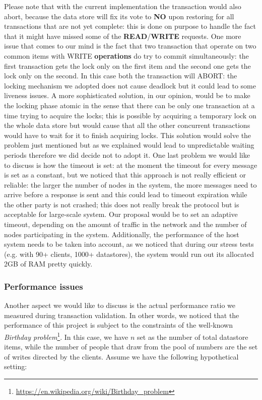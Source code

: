 Please note that with the current implementation the transaction would also abort, because the data store will fix its vote to \textbf{NO} upon restoring for all transactions that are not yet complete: this is done on purpose to handle the fact that it might have missed some of the \textbf{READ}/\textbf{WRITE} requests.
\newline
One more issue that comes to our mind is the fact that two transaction that operate on two common items with WRITE \textbf{operations} do try to commit simultaneously: the first transaction gets the lock only on the first item and the second one gets the lock only on the second. In this case both the transaction will ABORT: the locking mechanism we adopted does not cause deadlock but it could lead to some liveness issues. A more sophisticated solution, in our opinion, would be to make the locking phase atomic in the sense that there can be only one transaction at a time trying to acquire the locks; this is possible by acquiring a temporary lock on the whole data store but would cause that all the other concurrent transactions would have to wait for it to finish acquiring locks. This solution would solve the problem just mentioned but as we explained would lead to unpredictable waiting periods therefore we did decide not to adopt it.
\newline
One last problem we would like to discuss is how the timeout is set: at the moment the timeout for every message is set as a constant, but we noticed that this approach is not really efficient or reliable: the larger the number of nodes in the system, the more messages need to arrive before a response is sent and this could lead to timeout expiration while the other party is not crashed; this does not really break the protocol but is acceptable for large-scale system. Our proposal would be to set an adaptive timeout, depending on the amount of traffic in the network and the number of nodes participating in the system. Additionally, the performance of the host system needs to be taken into account, as we noticed that during our stress tests (e.g. with 90+ clients, 1000+ datastores), the system would run out its allocated 2GB of RAM pretty quickly.

\subsubsection{Performance issues}

Another aspect we would like to discuss is the actual performance ratio we measured during transaction validation. In other words, we noticed that the performance of this project is subject to the constraints of the well-known \textit{Birthday problem}\footnote{\url{https://en.wikipedia.org/wiki/Birthday_problem}}. In this case, we have $n$ set as the number of total datastore items, while the number of people that draw from the pool of numbers are the set of writes directed by the clients. Assume we have the following hypothetical setting:

